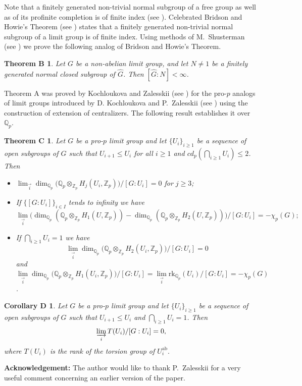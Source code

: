 \documentclass[10pt]{amsart}
\theoremstyle{plain}
\newtheorem*{thmB}{Theorem B}
\newtheorem*{thmC}{Theorem C}
\newtheorem*{thmD}{Corollary D}
\theoremstyle{definition}
\theoremstyle{remark}
\numberwithin{prop}{section}
\numberwithin{example}{section}
\numberwithin{equation}{section}
\newcommand{\Z}{\mathbb{Z}}
\newcommand{\Q}{\mathbb{Q}}
\newcommand{\rk}{\mathrm{rk}}
\newcommand{\ab}{\mathrm{ab}}
\begin{document}
	Note that a finitely generated  non-trivial normal  subgroup of a free group as well as of its profinite completion is  of finite index (see \cite[\S 8.6, Thm.~8.6.5]{ZR}). 
	Celebrated   Bridson and  Howie's Theorem (see \cite[ Thm~3.1]{Bri} ) states that a finitely generated non-trivial normal subgroup   of a limit group is of finite index. Using methods of M.~Shusterman (see \cite{shu2}) we prove the following analog of   Bridson and  Howie's Theorem.
	
	\begin{thmB}
		Let $G$ be a  non-abelian limit group, and  let $N\neq 1$ be a finitely generated  normal closed subgroup  of  $\widehat{G}$.  Then $[\widehat{G}:N]<\infty$. 
	\end{thmB}
	
	 
	
	
	Theorem A was proved by Kochloukova and Zalesskii (see \cite{AC}) for the pro-$p$ analogs of limit groups introduced by  D. Kochloukova and P.~Zalesskii (see \cite{AD}) using the construction of extension of centralizers.  
	The following result establishes   it over $\Q_p$.  	 
	\begin{thmC} 
		Let $G$ be a pro-$p$ limit group and let $\{U_{i}\}_{i \geq 1}$ be  a sequence of open subgroups of $G$ such that $U_{i+1}\leq U_i$  for all $i\geq 1$ and $cd_p(\displaystyle\bigcap_{i\geq 1}{U_i})\leq 2$. Then
		\begin{itemize}
			\item[(1)]
			$\displaystyle\lim_{\overrightarrow{i}}{\dim_{\Q_p}{\big(\Q_p\otimes_{\Z_p} H_j(U_i,\Z_p)\big)}/[G:U_i]}=0$  for $j\geq 3$;
			\item[(2)] If $\{[G:U_i]\}_{i\in I}$ tends to infinity we have
			$$\lim_{\overrightarrow{i}}{\big(\dim_{\Q_p}{(\Q_p\otimes_{\Z_p}H_1(U,\Z_p))-\dim_{\Q_p} (\Q_p\otimes_{\Z_p}H_2(U,\Z_p))\big)}/[G:U_i]}=-\chi_p(G);$$ 
			\item[(3)]If  $\displaystyle\bigcap_{i\geq 1}{U_i}=1$ we have \\
			$$\displaystyle\lim_{\overrightarrow{i}}\dim_{\Q_p}{\big(\Q_p\otimes_{\Z_p}{H_2(U_i,\Z_p)\big)}/[G:U_i]}=0$$  and\\ $$\displaystyle\lim_{\overrightarrow{i}}{\dim_{\Q_p}{\big(\Q_p\otimes_{\Z_p}H_1(U_i,\Z_p)\big)}/[G:U_i]}=\displaystyle\lim_{\overrightarrow{i}}{\rk_{\Q_p}(U_i)}/[G:U_i]=-\chi_p(G)$$.
		\end{itemize}
	\end{thmC}
	
	\begin{thmD}
		Let $G$ be a pro-$p$ limit group and let  $\{U_{i}\}_{i\geq 1}$ be a sequence of open subgroups of $G$ such that    $U_{i+1}\leq U_i$ and  $\displaystyle\bigcap_{i\geq 1}{U_i}=1$.  Then  $$\displaystyle\varinjlim_{i}{T(U_i)}/[G:U_i]=0,$$ where $T(U_i)$ is the rank of the torsion group of $U_i^{\ab}.$
	\end{thmD}
	\noindent
	{\bf Acknowledgement:}
	The author would like to thank P.~Zalesskii for a very useful comment concerning an
	earlier version of the paper. 
	
\end{document}
